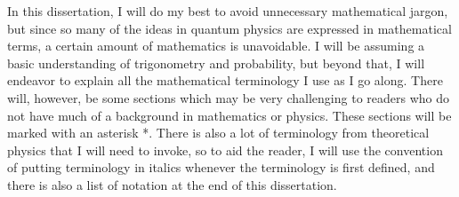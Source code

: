 In this dissertation, I will do my best to avoid unnecessary mathematical jargon, but since so many of the ideas in quantum physics are expressed in mathematical terms, a certain amount of mathematics is unavoidable. I will be assuming a basic understanding of trigonometry and probability, but beyond that, I will endeavor to explain all the mathematical terminology I use as I go along. There will, however, be some sections which may be very challenging to readers who do not have much of a background in mathematics or physics. These sections will be marked with an asterisk *.\label{asteriskmeaning} There is also a lot of terminology from theoretical physics that I will need to invoke, so to aid the reader, I will use the convention of putting terminology in italics whenever the terminology is first defined, and there is also a list of notation at the end of this dissertation.